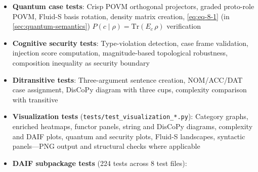 \documentclass[
]{article}
\begin{document}
\begin{itemize}
  with symmetry, N400 semantic violation proxy (including
  \texttt{test\_cognitive\_integration.py})
\item
  \textbf{Quantum case tests}: Crisp POVM orthogonal projectors, graded
  proto-role POVM, Fluid-S basis rotation, density matrix creation,
  \autoref{eq:eq-8-1} (in \autoref{sec:quantum-semantics})
  \(P(c\mid\rho) = \mathrm{Tr}(E_c\,\rho)\) verification
\item
  \textbf{Cognitive security tests}: Type-violation detection, case
  frame validation, injection score computation, magnitude-based
  topological robustness, composition inequality as security boundary
\item
  \textbf{Ditransitive tests}: Three-argument sentence creation,
  NOM/ACC/DAT case assignment, DisCoPy diagram with three cups,
  complexity comparison with transitive
\item
  \textbf{Visualization tests}
  (\texttt{tests/test\_visualization\_*.py}): Category graphs, enriched
  heatmaps, functor panels, string and DisCoPy diagrams, complexity and
  DAIF plots, quantum and security plots, Fluid-S landscapes, syntactic
  panels---PNG output and structural checks where applicable
\item
  \textbf{DAIF subpackage tests} (224 tests across 8 test files):


\end{itemize}
\end{document}
